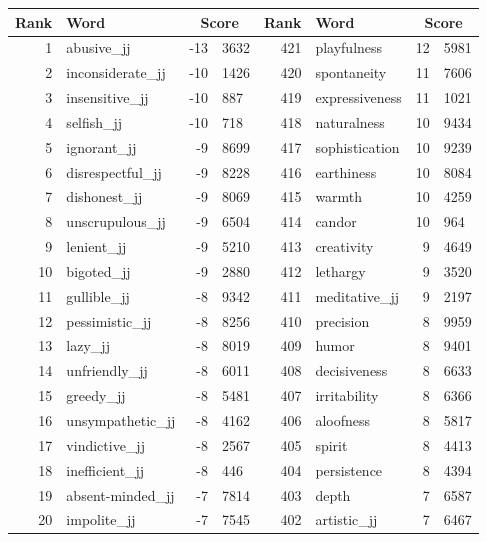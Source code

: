 \begin{table}[tbp]
    \begin{tabular}{| rlr@{.}l | rlr@{.}l |}
    \hline
    \textbf{Rank} & \textbf{Word} & \multicolumn{2}{c|}{\textbf{Score}} & \textbf{Rank} & \textbf{Word} & \multicolumn{2}{c|}{\textbf{Score}} \\
    \hline
    1 & abusive\_jj & -13 & 3632    &    421 & playfulness & 12 & 5981 \\
    2 & inconsiderate\_jj & -10 & 1426    &    420 & spontaneity & 11 & 7606 \\
    3 & insensitive\_jj & -10 & 887    &    419 & expressiveness & 11 & 1021 \\
    4 & selfish\_jj & -10 & 718    &    418 & naturalness & 10 & 9434 \\
    5 & ignorant\_jj & -9 & 8699    &    417 & sophistication & 10 & 9239 \\
    6 & disrespectful\_jj & -9 & 8228    &    416 & earthiness & 10 & 8084 \\
    7 & dishonest\_jj & -9 & 8069    &    415 & warmth & 10 & 4259 \\
    8 & unscrupulous\_jj & -9 & 6504    &    414 & candor & 10 & 964 \\
    9 & lenient\_jj & -9 & 5210    &    413 & creativity & 9 & 4649 \\
    10 & bigoted\_jj & -9 & 2880    &    412 & lethargy & 9 & 3520 \\
    11 & gullible\_jj & -8 & 9342    &    411 & meditative\_jj & 9 & 2197 \\
    12 & pessimistic\_jj & -8 & 8256    &    410 & precision & 8 & 9959 \\
    13 & lazy\_jj & -8 & 8019    &    409 & humor & 8 & 9401 \\
    14 & unfriendly\_jj & -8 & 6011    &    408 & decisiveness & 8 & 6633 \\
    15 & greedy\_jj & -8 & 5481    &    407 & irritability & 8 & 6366 \\
    16 & unsympathetic\_jj & -8 & 4162    &    406 & aloofness & 8 & 5817 \\
    17 & vindictive\_jj & -8 & 2567    &    405 & spirit & 8 & 4413 \\
    18 & inefficient\_jj & -8 & 446    &    404 & persistence & 8 & 4394 \\
    19 & absent-minded\_jj & -7 & 7814    &    403 & depth & 7 & 6587 \\
    20 & impolite\_jj & -7 & 7545    &    402 & artistic\_jj & 7 & 6467 \\

\end{tabular}
\end{table}
